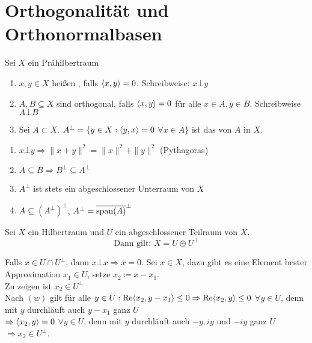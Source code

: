 


\section{Orthogonalität und Orthonormalbasen}


\begin{definition}
	Sei $X$ ein Prähilbertraum
	\begin{enumerate}[label=\alph*\upshape)]
		\item $x, y \in X$ hei{\ss}en , falls $\langle x, y \rangle = 0$. Schreibweise: $x \bot y$
		\item $A, B \subseteq X$ sind orthogonal, falls $\langle x, y \rangle = 0$ für alle $x \in A, y \in B$. Schreibweise $A \bot B$
		\item Sei $A \subset X$. $A^{\bot} = \{ y \in X: \langle y, x \rangle = 0$ $\forall x \in A \}$ ist das  von $A$ in $X$.
	\end{enumerate}
\end{definition}


\begin{bemerkung} \label{bem:16.2}
	\begin{enumerate}[label=\alph*\upshape)]
		\item $x \bot y \Rightarrow \| x + y \|^{2} = \| x \|^{2} + \| y \|^{2} $ (Pythagoras) 
		\item $A \subseteq B \Rightarrow B^{\bot} \subseteq A^{\bot}$
		\item $A^{\bot}$ ist stets ein abgeschlossener Unterraum von $X$
		\item $A \subseteq \left( A^{\bot} \right)^{\bot}$, $A^{\bot} = \overline{ \operatorname{span}(A) }^{\bot}$
	\end{enumerate}	
\end{bemerkung}


\begin{satz}[Orthogonalzerlegung]  \label{satz:13.6-Orthogonalzerlegung}
	Sei $X$ ein Hilbertraum und $U$ ein abgeschlossener Teilraum von $X$.
		\[ \text{Dann gilt: } X = U \oplus U^{\bot} \]
\end{satz}

\begin{beweis}
	Falls $x \in U \cap U^{\bot}$, dann $x \bot x \Rightarrow x = 0$. Sei $x \in X$, dazu gibt es eine Element bester Approximation $x_{1} \in U$, setze $x_{2} \coloneqq x - x_{1}$. \\
	Zu zeigen ist $x_{2} \in U^{\bot}$ \\
	Nach \hyperref[eq:15.7.5-SkalarproductbestApproximation]{$(w)$} gilt für alle $y \in U: \mathop{\rm Re}\nolimits \langle x_{2}, y - x_{1} \rangle \leq 0 \Rightarrow \mathop{\rm Re}\nolimits \langle x_{2}, y \rangle \leq 0$ $\forall y \in U$, denn mit $y$ durchläuft auch $y - x_{1}$ ganz $U$ \\
	$\Rightarrow \langle x_{2}, y \rangle = 0$ $\forall y \in U$, denn mit $y$ durchläuft auch $-y, iy$ und $-iy$ ganz $U$ $\Rightarrow x_{2} \in U^{\bot}$.
\end{beweis}


